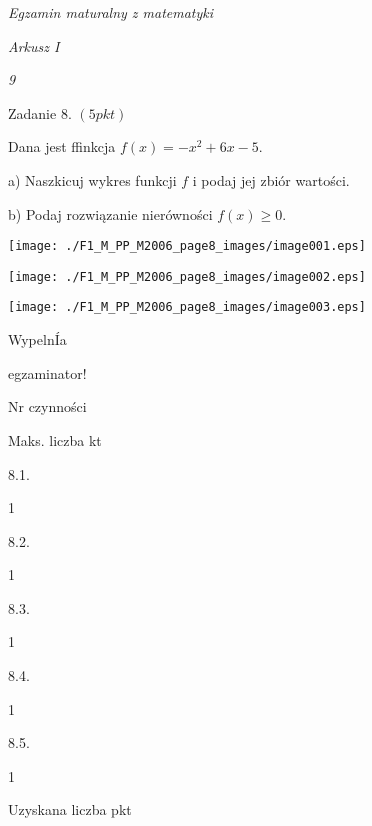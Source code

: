 \documentclass[a4paper,12pt]{article}
\begin{document}
{\it Egzamin maturalny z matematyki}

{\it Arkusz I}

{\it 9}

Zadanie 8. $(5pkt)$

Dana jest ffinkcja $f(x) =-x^{2} +6x-5.$

a) Naszkicuj wykres funkcji $f$ i podaj jej zbiór wartości.

b) Podaj rozwiązanie nierówności $f(x)\geq 0.$
\begin{center}
\texttt{[image: ./F1\_M\_PP\_M2006\_page8\_images/image001.eps]}

\texttt{[image: ./F1\_M\_PP\_M2006\_page8\_images/image002.eps]}

\texttt{[image: ./F1\_M\_PP\_M2006\_page8\_images/image003.eps]}
\end{center}
WypelnÍa

egzaminator!

Nr czynności

Maks. liczba kt

8.1.

1

8.2.

1

8.3.

1

8.4.

1

8.5.

1

Uzyskana liczba pkt
\end{document}

